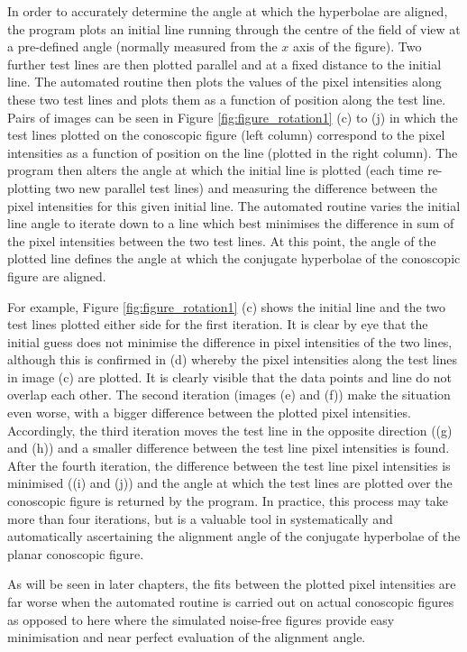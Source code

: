 In order to accurately determine the angle at which the hyperbolae are aligned, the program plots an initial line running through the centre of the field of view at a pre-defined angle (normally measured from the $x$ axis of the figure). Two further test lines are then plotted parallel and at a fixed distance to the initial line. The automated routine then plots the values of the pixel intensities along these two test lines and plots them as a function of position along the test line. Pairs of images can be seen in Figure \ref{fig:figure_rotation1} (c) to (j) in which the test lines plotted on the conoscopic figure (left column) correspond to the pixel intensities as a function of position on the line (plotted in the right column). The program then alters the angle at which the initial line is plotted (each time re-plotting two new parallel test lines) and measuring the difference between the pixel intensities for this given initial line. The automated routine varies the initial line angle to iterate down to a line which best minimises the difference in sum of the pixel intensities between the two test lines. At this point, the angle of the plotted line defines the angle at which the conjugate hyperbolae of the conoscopic figure are aligned.

For example, Figure \ref{fig:figure_rotation1} (c) shows the initial line and the two test lines plotted either side for the first iteration. It is clear by eye that the initial guess does not minimise the difference in pixel intensities of the two lines, although this is confirmed in (d) whereby the pixel intensities along the test lines in image (c) are plotted. It is clearly visible that the data points and line do not overlap each other. The second iteration (images (e) and (f)) make the situation even worse, with a bigger difference between the plotted pixel intensities. Accordingly, the third iteration moves the test line in the opposite direction ((g) and (h)) and a smaller difference between the test line pixel intensities is found. After the fourth iteration, the difference between the test line pixel intensities is minimised ((i) and (j)) and the angle at which the test lines are plotted over the conoscopic figure is returned by the program. In practice, this process may take more than four iterations, but is a valuable tool in systematically and automatically ascertaining the alignment angle of the conjugate hyperbolae of the planar conoscopic figure.

As will be seen in later chapters, the fits between the plotted pixel intensities are far worse when the automated routine is carried out on actual conoscopic figures as opposed to here where the simulated noise-free figures provide easy minimisation and near perfect evaluation of the alignment angle.

